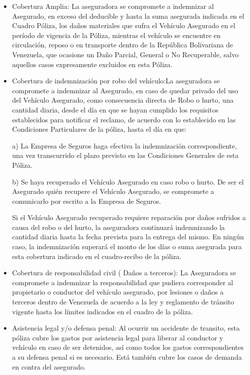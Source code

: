\begin{itemize}
	\item Cobertura Amplia: La aseguradora se compromete a  indemnizar al Asegurado, en exceso del deducible y hasta la suma asegurada indicada en el Cuadro Póliza, los daños materiales que sufra el Vehículo Asegurado en el período de vigencia de la Póliza, mientras el vehículo se encuentre en circulación, reposo o en transporte dentro de la República Bolivariana de Venezuela, que ocasione un Daño Parcial, General o No Recuperable, salvo aquellos casos expresamente excluidos en esta Póliza.

	\item Cobertura de indemnización por robo del vehículo:La aseguradora se compromete a indemnizar al Asegurado, en caso de quedar privado del uso del Vehículo Asegurado, como consecuencia directa de Robo o hurto, una cantidad diaria, desde el día en que se hayan cumplido los requisitos establecidos para notificar el reclamo, de acuerdo con lo establecido en las Condiciones Particulares de la póliza, hasta el día en que:

	a) La Empresa de Seguros haga efectiva la indemnización correspondiente, una vez transcurrido el plazo previsto en las Condiciones Generales de esta Póliza.

	b) Se haya recuperado el Vehículo Asegurado en caso robo o hurto. De ser el Asegurado quién recupere el Vehículo Asegurado, se compromete a comunicarlo por escrito a la Empresa de Seguros.

	Si el Vehículo Asegurado recuperado requiere reparación por daños sufridos a causa del robo o del hurto, la aseguradora continuará indemnizando la cantidad diaria hasta la fecha prevista para la entrega del mismo. En ningún caso, la indemnización superará el monto de los días o suma asegurada para esta cobertura indicado en el cuadro-recibo de la póliza.


	\item Cobertura de responsabilidad civil ( Daños a terceros): La Aseguradora se compromete a indemnizar la responsabilidad que pudiera corresponder al propietario o conductor del vehículo asegurado, por lesiones o daños a terceros dentro de Venezuela de acuerdo a la ley y reglamento de tránsito vigente hasta los límites indicados en el cuadro de la póliza.

	\item Asistencia legal y/o defensa penal: Al ocurrir un accidente de transito, esta póliza cubre los gastos por asistencia legal para liberar al conductor y vehículo en caso de ser detenidos, así como todos los gastos correspondientes a su defensa penal si es necesario. Está también cubre los casos de demanda en contra del asegurado.



\end{itemize}
